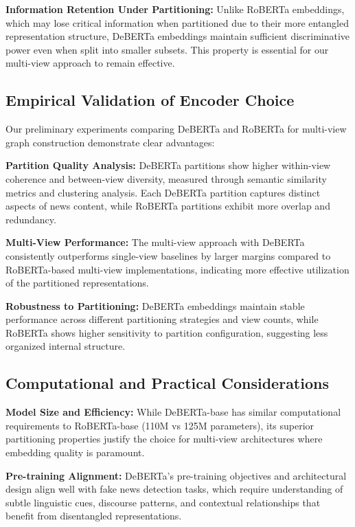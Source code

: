 \textbf{Information Retention Under Partitioning:} Unlike RoBERTa embeddings, which may lose critical information when partitioned due to their more entangled representation structure, DeBERTa embeddings maintain sufficient discriminative power even when split into smaller subsets. This property is essential for our multi-view approach to remain effective.

\subsection{Empirical Validation of Encoder Choice}

Our preliminary experiments comparing DeBERTa and RoBERTa for multi-view graph construction demonstrate clear advantages:

\textbf{Partition Quality Analysis:} DeBERTa partitions show higher within-view coherence and between-view diversity, measured through semantic similarity metrics and clustering analysis. Each DeBERTa partition captures distinct aspects of news content, while RoBERTa partitions exhibit more overlap and redundancy.

\textbf{Multi-View Performance:} The multi-view approach with DeBERTa consistently outperforms single-view baselines by larger margins compared to RoBERTa-based multi-view implementations, indicating more effective utilization of the partitioned representations.

\textbf{Robustness to Partitioning:} DeBERTa embeddings maintain stable performance across different partitioning strategies and view counts, while RoBERTa shows higher sensitivity to partition configuration, suggesting less organized internal structure.

\subsection{Computational and Practical Considerations}

\textbf{Model Size and Efficiency:} While DeBERTa-base has similar computational requirements to RoBERTa-base (110M vs 125M parameters), its superior partitioning properties justify the choice for multi-view architectures where embedding quality is paramount.

\textbf{Pre-training Alignment:} DeBERTa's pre-training objectives and architectural design align well with fake news detection tasks, which require understanding of subtle linguistic cues, discourse patterns, and contextual relationships that benefit from disentangled representations.

